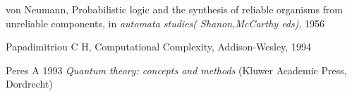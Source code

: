 \documentclass{article}
\begin{document}
\begin{thebibliography}{12}

% 
% 
% 
% 
% 
% 
% 
% 


von Neumann, 
Probabilistic logic and the synthesis of reliable organisms
		  from unreliable components,
in {\em automata studies( Shanon,McCarthy eds)}, 1956 


% 
% 

Papadimitriou C H, 
Computational Complexity, 
Addison-Wesley,
1994

% 
% 
% 
% 
% 

Peres A 1993
{\em Quantum theory: concepts and methods}
(Kluwer Academic Press, Dordrecht)





\end{thebibliography}
\end{document}
